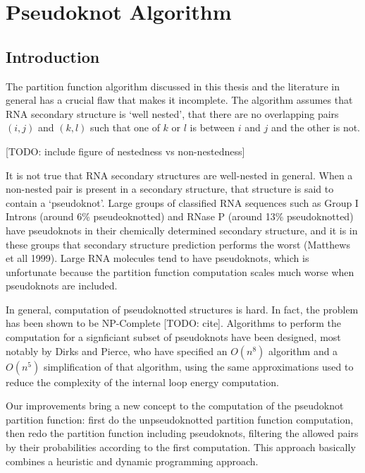\chapter{Pseudoknot Algorithm}
\section{Introduction}

The partition function algorithm discussed in this thesis and the
literature in general has a crucial flaw that makes it incomplete. The
algorithm assumes that RNA secondary structure is `well nested', that
there are no overlapping pairs $(i, j)$ and $(k, l)$ such that one of
$k$ or $l$ is between $i$ and $j$ and the other is not.

[TODO: include figure of nestedness vs non-nestedness]

It is not true that RNA secondary structures are well-nested in
general. When a non-nested pair is present in a secondary structure,
that structure is said to contain a `pseudoknot'. Large groups of
classified RNA sequences such as Group I Introns (around 6\%
pseudeoknotted) and RNase P (around 13\% pseudoknotted) have
pseudoknots in their chemically determined secondary structure, and it
is in these groups that secondary structure prediction performs the
worst (Matthews et all 1999). Large RNA molecules tend to have
pseudoknots, which is unfortunate because the partition function
computation scales much worse when pseudoknots are included.

In general, computation of pseudoknotted structures is hard. In fact,
the problem has been shown to be NP-Complete [TODO: cite]. Algorithms
to perform the computation for a signficiant subset of pseudoknots
have been designed, most notably by Dirks and Pierce, who have
specified an $O(n^8)$ algorithm and a $O(n^5)$ simplification of that
algorithm, using the same approximations used to reduce the complexity
of the internal loop energy computation.

Our improvements bring a new concept to the computation of the
pseudoknot partition function: first do the unpseudoknotted partition
function computation, then redo the partition function including
pseudoknots, filtering the allowed pairs by their probabilities
according to the first computation. This approach basically combines a
heuristic and dynamic programming approach.

